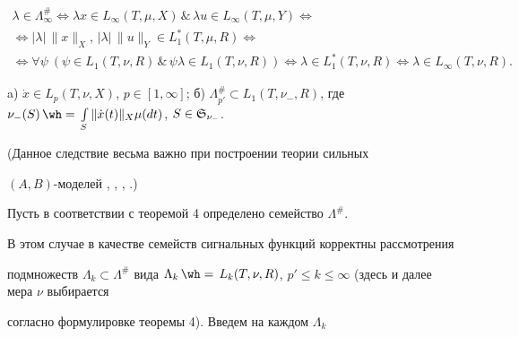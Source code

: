 \begin{multline*} 


\lambda\in\Lambda^{\#}_\infty\Longleftrightarrow \lambda x\in 


L_\infty(T,\mu,X)\,\&\, \lambda u\in L_\infty(T,\mu,Y) 


\Longleftrightarrow \\ 


% 


\Longleftrightarrow |\lambda|\,\|x\|_X,\,|\lambda|\,\|u\|_Y\in 


L^*_1(T,\mu,R)\Longleftrightarrow\\ 


\Longleftrightarrow \forall \psi\ (\psi\in L_1(T,\nu,R)\,\&\, 


\psi\lambda\in L_1(T,\nu,R)) \Longleftrightarrow 


\lambda\in L^*_1(T,\nu,R)\Longleftrightarrow \lambda\in 


L_\infty(T,\nu,R). 


\end{multline*} 


 


\begin{cor} 


a) $\Dot x\in L_p(T,\nu,X)$, $p\in[1,\infty]$; б) $\Lambda^{\#}_{p'} 


\subset L_1(T,\nu_-,R)$, где $\nu_-(S)\hateq\int\limits_S \|\Dot x(t)\|_X 


\mu(dt)$, $S\in\frak S_{\nu_-}$. 


\end{cor} 


 


(Данное следствие весьма важно при построении теории сильных 


$(A,B)$-моделей \cite{3}, \cite{4}, \cite{7}, \cite{9}.) 


 


Пусть в соответствии с теоремой 4 определено семейство $\Lambda^{\#}$. 


В этом случае в качестве семейств сигнальных функций корректны рассмотрения 


подмножеств $\Lambda_k\subset \Lambda^{\#}$ вида $\Lambda_k\hateq 


L_k(T,\nu,R)$, $p'\le k\le\infty$ (здесь и далее мера $\nu$ выбирается 


согласно формулировке теоремы 4). Введем на каждом $\Lambda_k$ 


